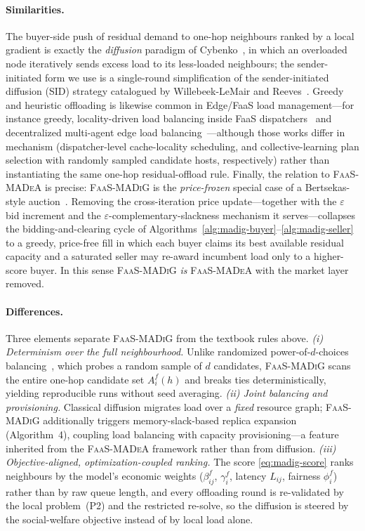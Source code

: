 \paragraph{Similarities.} The buyer-side push of residual demand to one-hop
neighbours ranked by a local gradient is exactly the \emph{diffusion} paradigm of
Cybenko~\citep{cybenko1989}, in which an overloaded node iteratively sends excess
load to its less-loaded neighbours; the sender-initiated form we use is a
single-round simplification of the sender-initiated diffusion (SID) strategy
catalogued by Willebeek-LeMair and Reeves~\citep{willebeek1993}. Greedy and
heuristic offloading is likewise common in Edge/FaaS load management---for
instance greedy, locality-driven load balancing inside FaaS
dispatchers~\citep{leechoi2021} and decentralized multi-agent edge load
balancing~\citep{nezami2021}---although those works differ in mechanism
(dispatcher-level cache-locality scheduling, and collective-learning plan
selection with randomly sampled candidate hosts, respectively) rather than
instantiating the same one-hop residual-offload rule. Finally, the relation to
\textsc{FaaS-MADeA} is precise: \textsc{FaaS-MADiG} is the \emph{price-frozen}
special case of a Bertsekas-style auction~\citep{bertsekas1988}. Removing the
cross-iteration price update---together with the $\varepsilon$ bid increment and
the $\varepsilon$-complementary-slackness mechanism it serves---collapses the
bidding-and-clearing cycle of
Algorithms~\ref{alg:madig-buyer}--\ref{alg:madig-seller} to a greedy,
price-free fill in which each buyer claims its best available residual capacity
and a saturated seller may re-award incumbent load only to a higher-score buyer.
In this sense \textsc{FaaS-MADiG} \emph{is} \textsc{FaaS-MADeA} with the market
layer removed.

\paragraph{Differences.} Three elements separate \textsc{FaaS-MADiG} from the
textbook rules above. \emph{(i) Determinism over the full neighbourhood.} Unlike
randomized power-of-$d$-choices balancing~\citep{mitzenmacher2001}, which probes
a random sample of $d$ candidates, \textsc{FaaS-MADiG} scans the entire one-hop
candidate set $A_i^f(h)$ and breaks ties deterministically, yielding reproducible
runs without seed averaging. \emph{(ii) Joint balancing and provisioning.}
Classical diffusion migrates load over a \emph{fixed} resource graph;
\textsc{FaaS-MADiG} additionally triggers memory-slack-based replica expansion
(Algorithm~4), coupling load balancing with capacity provisioning---a feature
inherited from the \textsc{FaaS-MADeA} framework rather than from diffusion.
\emph{(iii) Objective-aligned, optimization-coupled ranking.} The score
\eqref{eq:madig-score} ranks neighbours by the model's economic weights
($\beta_{ij}^f$, $\gamma_i^f$, latency $L_{ij}$, fairness $\phi_i^f$) rather than
by raw queue length, and every offloading round is re-validated by the local
problem~(P2) and the restricted re-solve, so the diffusion is steered by the
social-welfare objective instead of by local load alone.

